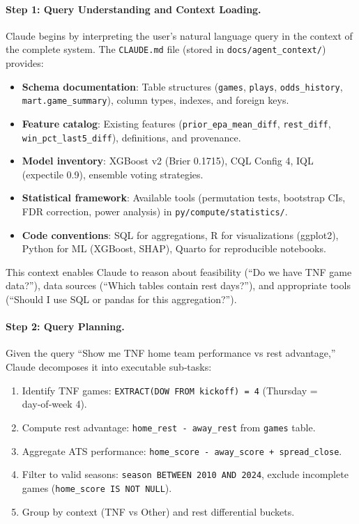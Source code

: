 \paragraph{Step 1: Query Understanding and Context Loading.}
Claude begins by interpreting the user's natural language query in the context of the complete system. The \texttt{CLAUDE.md} file (stored in \texttt{docs/agent\_context/}) provides:
\begin{itemize}
\item \textbf{Schema documentation}: Table structures (\texttt{games}, \texttt{plays}, \texttt{odds\_history}, \texttt{mart.game\_summary}), column types, indexes, and foreign keys.
\item \textbf{Feature catalog}: Existing features (\texttt{prior\_epa\_mean\_diff}, \texttt{rest\_diff}, \texttt{win\_pct\_last5\_diff}), definitions, and provenance.
\item \textbf{Model inventory}: XGBoost v2 (Brier 0.1715), CQL Config 4, IQL (expectile 0.9), ensemble voting strategies.
\item \textbf{Statistical framework}: Available tools (permutation tests, bootstrap CIs, FDR correction, power analysis) in \texttt{py/compute/statistics/}.
\item \textbf{Code conventions}: SQL for aggregations, R for visualizations (ggplot2), Python for ML (XGBoost, SHAP), Quarto for reproducible notebooks.
\end{itemize}

This context enables Claude to reason about feasibility (``Do we have TNF game data?''), data sources (``Which tables contain rest days?''), and appropriate tools (``Should I use SQL or pandas for this aggregation?'').

\paragraph{Step 2: Query Planning.}
Given the query ``Show me TNF home team performance vs rest advantage,'' Claude decomposes it into executable sub‑tasks:
\begin{enumerate}
\item Identify TNF games: \texttt{EXTRACT(DOW FROM kickoff) = 4} (Thursday = day‑of‑week 4).
\item Compute rest advantage: \texttt{home\_rest - away\_rest} from \texttt{games} table.
\item Aggregate ATS performance: \texttt{home\_score - away\_score + spread\_close}.
\item Filter to valid seasons: \texttt{season BETWEEN 2010 AND 2024}, exclude incomplete games (\texttt{home\_score IS NOT NULL}).
\item Group by context (TNF vs Other) and rest differential buckets.
\end{enumerate}

